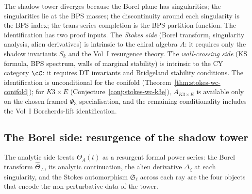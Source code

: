 The shadow tower diverges because the Borel plane has singularities; the singularities lie at the BPS masses; the discontinuity around each singularity is the BPS index; the trans-series completion is the BPS partition function. The identification has two proof inputs. The \emph{Stokes side} (Borel transform, singularity analysis, alien derivatives) is intrinsic to the chiral algebra $A$: it requires only the shadow invariants $S_k$ and the Vol~I resurgence theory. The \emph{wall-crossing side} (KS formula, BPS spectrum, walls of marginal stability) is intrinsic to the CY category $\cC$: it requires DT invariants and Bridgeland stability conditions. The identification is unconditional for the conifold (Theorem~\ref{thm:stokes-wc-conifold}); for $K3 \times E$ (Conjecture~\ref{conj:stokes-wc-k3e}), $A_{K3 \times E}$ is available only on the chosen framed $\Phi_3$ specialisation, and the remaining conditionality includes the Vol~I Borcherds-lift identification.

\subsection{The Borel side: resurgence of the shadow tower}
\label{subsec:borel-side}
%

The analytic side treats $\Theta_A(t)$ as a resurgent formal power series: the Borel transform $\hat{\Theta}_A$, its analytic continuation, the alien derivative $\Delta_\zeta$ at each singularity, and the Stokes automorphism $\mathfrak{S}_\ell$ across each ray are the four objects that encode the non-perturbative data of the tower.

